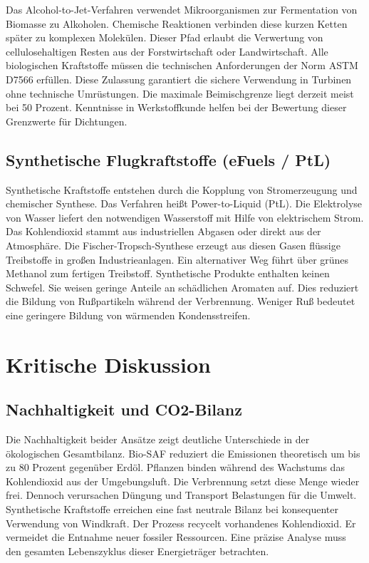 \documentclass[12pt,a4paper]{article}
\begin{document}
Das Alcohol-to-Jet-Verfahren verwendet Mikroorganismen zur Fermentation von Biomasse zu Alkoholen. Chemische Reaktionen verbinden diese kurzen Ketten später zu komplexen Molekülen. Dieser Pfad erlaubt die Verwertung von cellulosehaltigen Resten aus der Forstwirtschaft oder Landwirtschaft. Alle biologischen Kraftstoffe müssen die technischen Anforderungen der Norm ASTM D7566 erfüllen. Diese Zulassung garantiert die sichere Verwendung in Turbinen ohne technische Umrüstungen. Die maximale Beimischgrenze liegt derzeit meist bei 50 Prozent. Kenntnisse in Werkstoffkunde helfen bei der Bewertung dieser Grenzwerte für Dichtungen.

\subsection{Synthetische Flugkraftstoffe (eFuels / PtL)}
Synthetische Kraftstoffe entstehen durch die Kopplung von Stromerzeugung und chemischer Synthese. Das Verfahren heißt Power-to-Liquid (PtL). Die Elektrolyse von Wasser liefert den notwendigen Wasserstoff mit Hilfe von elektrischem Strom. Das Kohlendioxid stammt aus industriellen Abgasen oder direkt aus der Atmosphäre. Die Fischer-Tropsch-Synthese erzeugt aus diesen Gasen flüssige Treibstoffe in großen Industrieanlagen. Ein alternativer Weg führt über grünes Methanol zum fertigen Treibstoff. Synthetische Produkte enthalten keinen Schwefel. Sie weisen geringe Anteile an schädlichen Aromaten auf. Dies reduziert die Bildung von Rußpartikeln während der Verbrennung. Weniger Ruß bedeutet eine geringere Bildung von wärmenden Kondensstreifen.

\newpage
\section{Kritische Diskussion}

\subsection{Nachhaltigkeit und CO2-Bilanz}
Die Nachhaltigkeit beider Ansätze zeigt deutliche Unterschiede in der ökologischen Gesamtbilanz. Bio-SAF reduziert die Emissionen theoretisch um bis zu 80 Prozent gegenüber Erdöl. Pflanzen binden während des Wachstums das Kohlendioxid aus der Umgebungsluft. Die Verbrennung setzt diese Menge wieder frei. Dennoch verursachen Düngung und Transport Belastungen für die Umwelt. Synthetische Kraftstoffe erreichen eine fast neutrale Bilanz bei konsequenter Verwendung von Windkraft. Der Prozess recycelt vorhandenes Kohlendioxid. Er vermeidet die Entnahme neuer fossiler Ressourcen. Eine präzise Analyse muss den gesamten Lebenszyklus dieser Energieträger betrachten.
\end{document}
